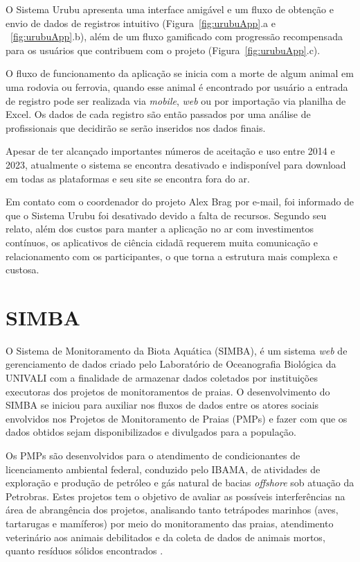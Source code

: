 O Sistema Urubu apresenta uma interface amigável e um fluxo de obtenção e envio de dados de registros intuitivo (Figura~\ref{fig:urubuApp}.a e ~\ref{fig:urubuApp}.b), além de um fluxo gamificado com progressão recompensada para os usuários que contribuem com o projeto (Figura~\ref{fig:urubuApp}.c).

O fluxo de funcionamento da aplicação se inicia com a morte de algum animal em uma rodovia ou ferrovia, quando esse animal é encontrado por usuário a entrada de registro pode ser realizada via \textit{mobile}, \textit{web} ou por importação via planilha de Excel. Os dados de cada registro são então passados por uma análise de profissionais que decidirão se serão inseridos nos dados finais.

Apesar de ter alcançado importantes números de aceitação e uso entre 2014 e 2023, atualmente o sistema se encontra desativado e indisponível para download em todas as plataformas e seu site se encontra fora do ar.

Em contato com o coordenador do projeto Alex Brag por e-mail, foi informado de que o Sistema Urubu foi desativado devido a falta de recursos. Segundo seu relato, além dos custos para manter a aplicação no ar com investimentos contínuos, os aplicativos de ciência cidadã requerem muita comunicação e relacionamento com os participantes, o que torna a estrutura mais complexa e custosa.

\section{SIMBA}\label{simba}

O Sistema de Monitoramento da Biota Aquática (SIMBA), é um sistema \textit{web} de gerenciamento de dados criado pelo Laboratório de Oceanografia Biológica da UNIVALI com a finalidade de armazenar dados coletados por instituições executoras dos projetos de monitoramentos de praias. O desenvolvimento do SIMBA se iniciou para auxiliar nos fluxos de dados entre os atores sociais envolvidos nos Projetos de Monitoramento de Praias (PMPs) e fazer com que os dados obtidos sejam disponibilizados e divulgados para a população.

Os PMPs são desenvolvidos para o atendimento de condicionantes de licenciamento ambiental federal, conduzido pelo IBAMA, de atividades de exploração e produção de petróleo e gás natural de bacias \textit{offshore} sob atuação da Petrobras. Estes projetos tem o objetivo de avaliar as possíveis interferências na área de abrangência dos projetos, analisando tanto tetrápodes marinhos (aves, tartarugas e mamíferos) por meio do monitoramento das praias, atendimento veterinário aos animais debilitados e da coleta de dados de animais mortos, quanto resíduos sólidos encontrados \cite{petrobras_simba_2024}.

